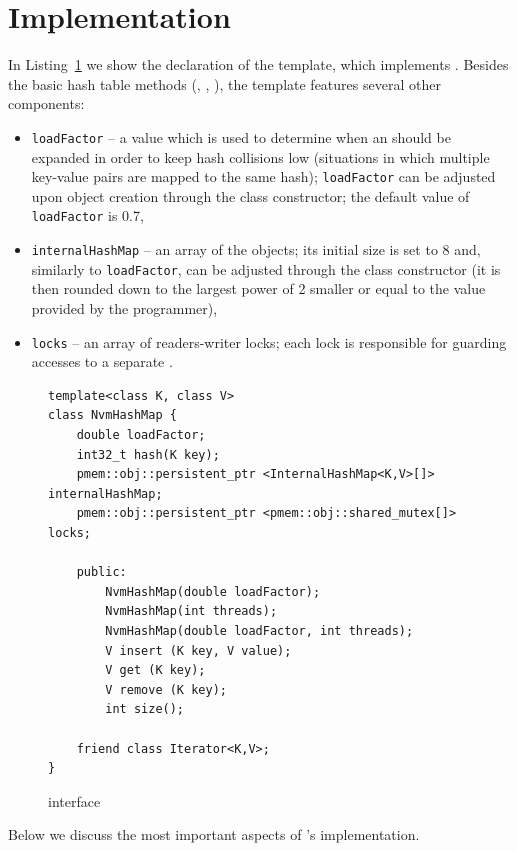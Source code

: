 \section{Implementation}

    In Listing~\ref{NvmHashMap} we show the declaration of the \NvmHashMap template, which implements \PHT. Besides the basic hash table methods (\getMethod, \insertMethod, \removeMethod), the template features several other components:
    \begin{itemize}
        \item \texttt{loadFactor} -- a value which is used to determine when an \internalHashMap should be expanded in order to keep hash collisions low (situations in which multiple key-value pairs are mapped to the same hash); \texttt{loadFactor} can be adjusted upon object creation through the class constructor; the default value of \texttt{loadFactor} is 0.7, 
        \item \texttt{internalHashMap} -- an array of the \internalHashMap objects; its initial size is set to 8 and, similarly to \texttt{loadFactor}, can be adjusted through the class constructor (it is then rounded down to the largest power of 2 smaller or equal to the value provided by the programmer),
        \item \texttt{locks} -- an array of readers-writer locks; each lock is responsible for guarding accesses to a separate \internalHashMap.
    \end{itemize}

\begin{figure}[ht] 
\renewcommand{\figurename}{Listing}
    \begin{lstlisting}
template<class K, class V> 
class NvmHashMap {
    double loadFactor;
    int32_t hash(K key);
    pmem::obj::persistent_ptr <InternalHashMap<K,V>[]> internalHashMap;
    pmem::obj::persistent_ptr <pmem::obj::shared_mutex[]> locks;
    
    public: 
        NvmHashMap(double loadFactor);
        NvmHashMap(int threads);
        NvmHashMap(double loadFactor, int threads);
        V insert (K key, V value);
        V get (K key);
        V remove (K key);
        int size();
    
    friend class Iterator<K,V>;
}
    \end{lstlisting}
\caption{\NvmHashMap interface}
\label{NvmHashMap}
\end{figure}

    Below we discuss the most important aspects of \PHT's implementation.
    
